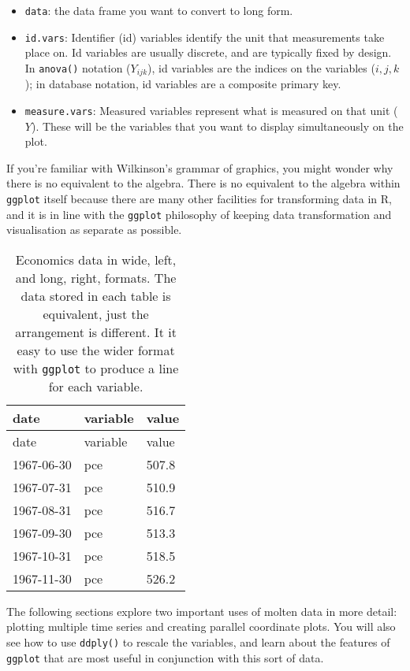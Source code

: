 \begin{itemize}
\itemsep1pt\parskip0pt
\item
  \texttt{data}: the data frame you want to convert to long form.
\item
  \texttt{id.vars}: Identifier (id) variables identify the unit that
  measurements take place on. Id variables are usually discrete, and are
  typically fixed by design. In \texttt{anova()} notation (\(Y_{ijk}\)),
  id variables are the indices on the variables (\(i, j, k\)); in
  database notation, id variables are a composite primary key.
\item
  \texttt{measure.vars}: Measured variables represent what is measured
  on that unit (\(Y\)). These will be the variables that you want to
  display simultaneously on the plot.
\end{itemize}

If you're familiar with Wilkinson's grammar of graphics, you might
wonder why there is no equivalent to the algebra. There is no equivalent
to the algebra within \texttt{ggplot} itself because there are many
other facilities for transforming data in R, and it is in line with the
\texttt{ggplot} philosophy of keeping data transformation and
visualisation as separate as possible.

\begin{longtable}[c]{@{}lll@{}}
\caption{Economics data in wide, left, and long, right, formats. The
data stored in each table is equivalent, just the arrangement is
different. It it easy to use the wider format with \texttt{ggplot} to
produce a line for each variable.}\tabularnewline
\toprule
date & variable & value\tabularnewline
\midrule
\endfirsthead
\toprule
date & variable & value\tabularnewline
\midrule
\endhead
1967-06-30 & pce & 507.8\tabularnewline
1967-07-31 & pce & 510.9\tabularnewline
1967-08-31 & pce & 516.7\tabularnewline
1967-09-30 & pce & 513.3\tabularnewline
1967-10-31 & pce & 518.5\tabularnewline
1967-11-30 & pce & 526.2\tabularnewline
\bottomrule
\end{longtable}

The following sections explore two important uses of molten data in more
detail: plotting multiple time series and creating parallel coordinate
plots. You will also see how to use \texttt{ddply()} to rescale the
variables, and learn about the features of \texttt{ggplot} that are most
useful in conjunction with this sort of data.


